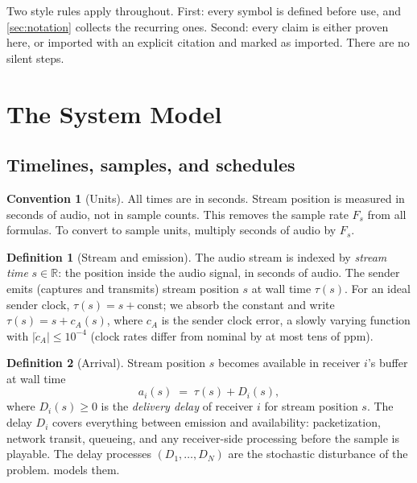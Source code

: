 \documentclass[11pt, a4paper]{article}
\theoremstyle{definition}
\newtheorem{definition}{Definition}[section]
\newtheorem{convention}{Convention}[section]
\theoremstyle{plain}
\theoremstyle{remark}
\newcommand{\R}{\mathbb{R}}
\begin{document}
Two style rules apply throughout.  First: every symbol is defined before
use, and \cref{sec:notation} collects the recurring ones.  Second: every claim is
either proven here, or imported with an explicit citation and marked as
imported.  There are no silent steps.

\section{The System Model}\label{sec:model}

\subsection{Timelines, samples, and schedules}\label{sec:timelines}

\begin{convention}[Units]\label{conv:units}
All times are in seconds.  Stream position is measured in seconds of audio,
not in sample counts.  This removes the sample rate $F_s$ from all
formulas.  To convert to sample units, multiply seconds of audio by $F_s$.
\end{convention}

\begin{definition}[Stream and emission]\label{def:stream}
The audio stream is indexed by \emph{stream time} $s \in \R$: the position
inside the audio signal, in seconds of audio.  The sender emits (captures
and transmits) stream position $s$ at wall time $\tau(s)$.  For an ideal
sender clock, $\tau(s) = s + \text{const}$; we absorb the constant and
write $\tau(s) = s + c_A(s)$, where $c_A$ is the sender clock error, a
slowly varying function with $|\dot c_A| \le 10^{-4}$ (clock rates differ
from nominal by at most tens of ppm).
\end{definition}

\begin{definition}[Arrival]\label{def:arrival}
Stream position $s$ becomes available in receiver $i$'s buffer at wall
time
\begin{equation}\label{eq:arrival}
  a_i(s) \;=\; \tau(s) + D_i(s),
\end{equation}
where $D_i(s) \ge 0$ is the \emph{delivery delay} of receiver $i$ for
stream position $s$.  The delay $D_i$ covers everything between emission
and availability: packetization, network transit, queueing, and any
receiver-side processing before the sample is playable.  The delay
processes $(D_1, \dots, D_N)$ are the stochastic disturbance of the
problem.   models them.
\end{definition}
\end{document}
